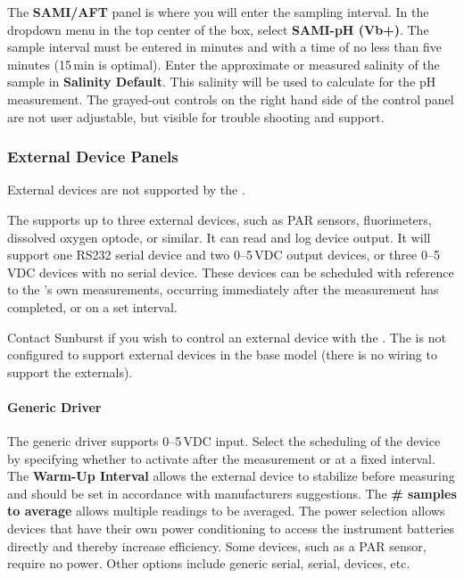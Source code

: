 The \textbf{SAMI/AFT} panel is where you will enter the sampling interval. In the dropdown menu in the top center of the box, select \textbf{SAMI-pH (Vb+)}. The sample interval must be entered in minutes and with a time of no less than five minutes (15\,min is optimal).  Enter the approximate or measured salinity of the sample in \textbf{Salinity Default}.  This salinity will be used to calculate \pKa for the pH measurement.  The grayed-out controls on the right hand side of the control panel are not user adjustable, but visible for trouble shooting and support.


\subsubsection{External Device Panels}

\ifcase \inst	%

External devices are not supported by the \instType{}.

\else			%

The \instType{} supports up to three external devices, such as PAR sensors, fluorimeters, dissolved oxygen optode, or similar. It can read and log device output. It will support one RS232 serial device and two 0--5\,VDC output devices, or three 0--5\,VDC devices with no serial device. These devices can be scheduled with reference to the \instType{}'s own measurements, occurring immediately after the measurement has completed, or on a set interval.

Contact Sunburst if you wish to control an external device with the \instType{}. The \instType{} is not configured to support external devices in the base model (there is no wiring to support the externals).

\paragraph{Generic Driver}
The generic driver supports 0--5\,VDC input. Select the scheduling of the device by specifying whether to activate after the \instType{} measurement or at a fixed interval. The \textbf{Warm-Up Interval} allows the external device to stabilize before measuring and should be set in accordance with manufacturers suggestions. The \textbf{\# samples to average} allows multiple readings to be averaged. The power selection allows devices that have their own power conditioning to access the instrument batteries directly and thereby increase efficiency.  Some devices, such as a PAR sensor, require no power.  Other options include generic serial, serial, devices, etc.

